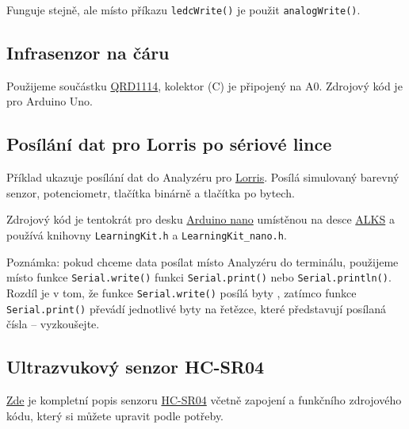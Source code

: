 
 
Funguje stejně, ale místo příkazu {\tt ledcWrite()} je použit {\tt analogWrite()}.

\subsection{Infrasenzor na čáru} \label{prog:qrd1114}

Použijeme součástku \hyperref[qrd1114]{QRD1114}, kolektor (C) je připojený na A0. Zdrojový kód je pro Arduino Uno. 




\subsection{Posílání dat pro Lorris po sériové lince} \label{prog:lorris}

Příklad ukazuje posílání dat do Analyzéru pro \hyperref[lorris]{Lorris}.
 Posílá simulovaný barevný senzor, potenciometr, tlačítka binárně a tlačítka po bytech. 

Zdrojový kód je tentokrát pro desku \hyperref[alks:nano]{Arduino nano}
 umístěnou na desce \hyperref[alks]{ALKS} a používá knihovny
{\tt LearningKit.h}  a  {\tt LearningKit\_nano.h}. 

Poznámka: pokud chceme data posílat místo Analyzéru do terminálu, použijeme místo funkce {\tt Serial.write()}
funkci {\tt Serial.print()} nebo {\tt Serial.println()}. Rozdíl je v tom, že funkce {\tt Serial.write()} posílá byty , zatímco funkce {\tt Serial.print()} převádí jednotlivé byty na řetězce, které představují posílaná čísla -- vyzkoušejte.   





\label{prog:sr04} 
\subsection{Ultrazvukový senzor HC-SR04} 

  \href{https://randomnerdtutorials.com/complete-guide-for-ultrasonic-sensor-hc-sr04/}{Zde}
je kompletní popis senzoru \hyperref[hcsr04]{HC-SR04} včetně zapojení a funkčního zdrojového kódu, který si můžete upravit podle potřeby.  




